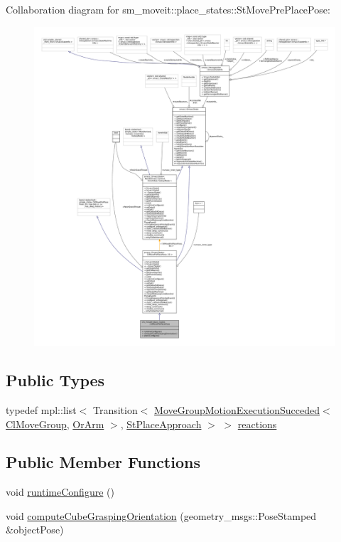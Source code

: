 Collaboration diagram for sm\+\_\+moveit\+:\+:place\+\_\+states\+:\+:St\+Move\+Pre\+Place\+Pose\+:
\nopagebreak
\begin{figure}[H]
\begin{center}
\leavevmode
\includegraphics[width=350pt]{structsm__moveit_1_1place__states_1_1StMovePrePlacePose__coll__graph}
\end{center}
\end{figure}
\subsection*{Public Types}
\begin{DoxyCompactItemize}
\item 
typedef mpl\+::list$<$ Transition$<$ \hyperlink{structsm__moveit_1_1cl__movegroup_1_1MoveGroupMotionExecutionSucceded}{Move\+Group\+Motion\+Execution\+Succeded}$<$ \hyperlink{classsm__moveit_1_1cl__movegroup_1_1ClMoveGroup}{Cl\+Move\+Group}, \hyperlink{classsm__moveit_1_1OrArm}{Or\+Arm} $>$, \hyperlink{structsm__moveit_1_1place__states_1_1StPlaceApproach}{St\+Place\+Approach} $>$ $>$ \hyperlink{structsm__moveit_1_1place__states_1_1StMovePrePlacePose_ae4526e251f44c3aa5ef2606d0a1e273d}{reactions}
\end{DoxyCompactItemize}
\subsection*{Public Member Functions}
\begin{DoxyCompactItemize}
\item 
void \hyperlink{structsm__moveit_1_1place__states_1_1StMovePrePlacePose_afb210c2d0b44f2df7904a40f66f9ef0b}{runtime\+Configure} ()
\item 
void \hyperlink{structsm__moveit_1_1place__states_1_1StMovePrePlacePose_add6f85ba0aa1e3905645881ecd0ba4e1}{compute\+Cube\+Grasping\+Orientation} (geometry\+\_\+msgs\+::\+Pose\+Stamped \&object\+Pose)
\end{DoxyCompactItemize}
